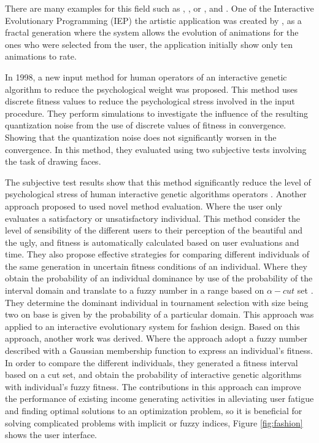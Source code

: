 There are many examples for this field such as
\cite{mckenna1990dynamic},
\cite{ventrella1994explorations}, or
\cite{ventrella1995disney}, \cite{lim1999pro} and
\cite{lim2000solve}. One of the Interactive Evolutionary Programming
(IEP) the artistic application was created by \cite{angeline1996evolving}, as a
fractal generation where the system allows the evolution of animations for the
ones who were selected from the user, the application initially show only ten
animations to rate.

In 1998, a new input method for human operators of an interactive genetic
algorithm to reduce the psychological weight was proposed. This method uses
discrete fitness values to reduce the psychological stress involved in the input
procedure. They perform simulations to investigate the influence of the
resulting quantization noise from the use of discrete values of fitness in
convergence. Showing that the quantization noise does not significantly worsen
in the convergence. In this method, they evaluated using two subjective tests
involving the task of drawing faces.


The subjective test results show that this method significantly reduce the level
of psychological stress of human interactive genetic algorithms operators
\cite{ohsaki1998input}. Another approach proposed to used novel method
evaluation. Where the user only evaluates a satisfactory or unsatisfactory
individual. This method consider the level of sensibility of the different users
to their perception of the beautiful and the ugly, and fitness is automatically
calculated based on user evaluations and time. They also propose effective
strategies for comparing different individuals of the same generation in
uncertain fitness conditions of an individual. Where they obtain the probability
of an individual dominance by use of the probability of the interval domain and
translate to a fuzzy number in a range based on $\alpha-cut$ set \cite{gong2009impact}.
They determine the dominant individual in tournament selection with size being
two on base is given by the probability of a particular domain. This approach
was applied to an interactive evolutionary system for fashion design. Based on this approach,
another work was derived. Where the approach adopt a fuzzy number described
with a Gaussian membership function to express an individual's fitness. In order
to compare the different individuals, they generated a fitness interval based on
a cut set, and obtain the probability of interactive genetic algorithms with
individual's fuzzy fitness. The contributions in this approach can improve the
performance of existing income generating activities in alleviating user fatigue
and finding optimal solutions to an optimization problem, so it is beneficial
for solving complicated problems with implicit or fuzzy indices\cite{gong2011interactive}, Figure \ref{fig:fashion}
shows the user interface.


